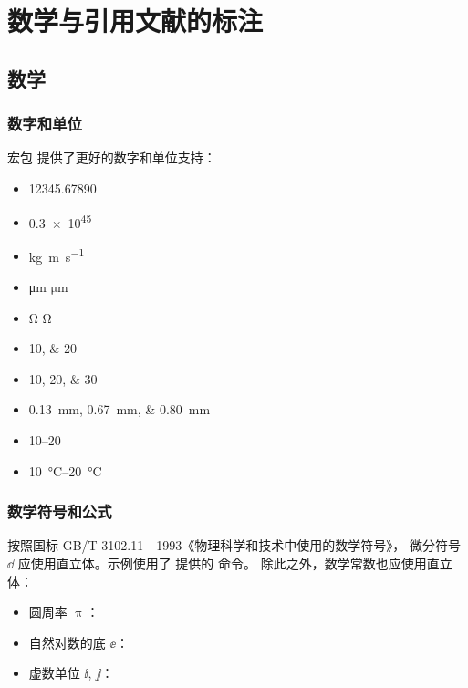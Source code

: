 
\chapter{数学与引用文献的标注}

\section{数学}

\subsection{数字和单位}

宏包  提供了更好的数字和单位支持：
\begin{itemize}
  \item \num{12345.67890}
  \item \num{.3e45}
  \item \si{kg.m.s^{-1}}
  \item \si{\micro\meter} $\si{\micro\meter}$
  \item \si{\ohm} $\si{\ohm}$
  \item \numlist{10;20}
  \item \numlist{10;20;30}
  \item \SIlist{0.13;0.67;0.80}{\milli\metre}
  \item \numrange{10}{20}
  \item \SIrange{10}{20}{\degreeCelsius}
\end{itemize}

\subsection{数学符号和公式}

按照国标 GB/T 3102.11—1993《物理科学和技术中使用的数学符号》，
微分符号 $\dd$ 应使用直立体。示例使用了  提供的  命令。
除此之外，数学常数也应使用直立体：
\begin{itemize}
  \item 圆周率 $\uppi$：
  \item 自然对数的底 $\ee$：
  \item 虚数单位 $\ii$, $\jj$： 
\end{itemize}

